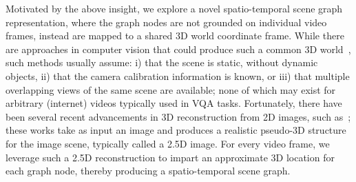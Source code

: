 \documentclass[letterpaper]{article}
\begin{document}
Motivated by the above insight, we explore a novel spatio-temporal scene graph representation, where the graph nodes are not grounded on individual video frames, instead are mapped to a shared 3D world coordinate frame. While there are approaches in computer vision that could produce such a common 3D world~\cite{multiview}, such methods usually assume: i) that the scene is static, without dynamic objects,  ii) that the camera calibration information is known, or iii) that multiple overlapping views of the same scene are available; none of which may exist for arbitrary (internet) videos typically used in VQA tasks. Fortunately, there have been several recent advancements in 3D reconstruction from 2D images, such as~\cite{ranftl2019towards,fu2018deep}; these works take as input an image and produces a realistic pseudo-3D structure for the image scene, typically called a 2.5D image. For every video frame, we leverage such a 2.5D reconstruction to impart an approximate 3D location for each graph node, thereby producing a \name spatio-temporal scene graph.
\end{document}
